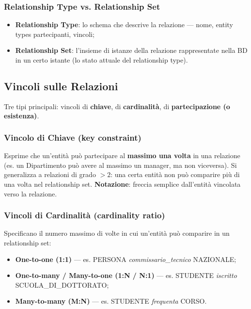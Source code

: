 \documentclass[12pt, a4paper]{article}
\begin{document}
\subsubsection{Relationship Type vs. Relationship Set}
\begin{itemize}
    \item \textbf{Relationship Type}: lo schema che descrive la relazione — nome, entity types partecipanti, vincoli;
    \item \textbf{Relationship Set}: l'insieme di istanze della relazione rappresentate nella BD in un certo istante (lo stato attuale del relationship type).
\end{itemize}

\subsection{Vincoli sulle Relazioni}

Tre tipi principali: vincoli di \textbf{chiave}, di \textbf{cardinalità}, di \textbf{partecipazione (o esistenza)}.

\subsubsection{Vincolo di Chiave (key constraint)}
Esprime che un'entità può partecipare al \textbf{massimo una volta} in una relazione (es. un Dipartimento può avere al massimo un manager, ma non viceversa). Si generalizza a relazioni di grado $>2$: una certa entità non può comparire più di una volta nel relationship set. \textbf{Notazione}: freccia semplice dall'entità vincolata verso la relazione.

\subsubsection{Vincoli di Cardinalità (cardinality ratio)}
Specificano il numero massimo di volte in cui un'entità può comparire in un relationship set:
\begin{itemize}
    \item \textbf{One-to-one (1:1)} — es. PERSONA \textit{commissario\_tecnico} NAZIONALE;
    \item \textbf{One-to-many / Many-to-one (1:N / N:1)} — es. STUDENTE \textit{iscritto} SCUOLA\_DI\_DOTTORATO;
    \item \textbf{Many-to-many (M:N)} — es. STUDENTE \textit{frequenta} CORSO.
\end{itemize}
\end{document}
